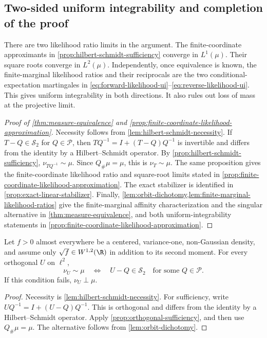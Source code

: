 \subsection{Two-sided uniform integrability and completion of the proof}
\label{sec:likelihood-convergence}

There are two likelihood ratio limits in the argument.
The finite-coordinate approximants in \cref{prop:hilbert-schmidt-sufficiency} converge in
\(L^1(\mu)\).
Their square roots converge in \(L^2(\mu)\).
Independently, once equivalence is known, the finite-marginal likelihood ratios and
their reciprocals are the two conditional-expectation martingales in
\eqref{eq:forward-likelihood-ui}--\eqref{eq:reverse-likelihood-ui}.
This gives uniform integrability in both directions.
It also rules out loss of mass at the projective limit.

\begin{proof}[Proof of \cref{thm:measure-equivalence} and \cref{prop:finite-coordinate-likelihood-approximation}]
Necessity follows from \cref{lem:hilbert-schmidt-necessity}.  If
$T-Q\in\mathcal S_2$ for $Q\in\mathcal P$, then
$TQ^{-1}=I+(T-Q)Q^{-1}$ is invertible and differs from the identity
by a Hilbert--Schmidt operator.  By \cref{prop:hilbert-schmidt-sufficiency},
$\nu_{TQ^{-1}}\sim\mu$.  Since $Q_\#\mu=\mu$, this is
$\nu_T\sim\mu$.  The same proposition gives the finite-coordinate
likelihood ratio and square-root limits stated in
\cref{prop:finite-coordinate-likelihood-approximation}.
The exact stabilizer is identified in \cref{prop:exact-linear-stabilizer}.
Finally, \cref{lem:orbit-dichotomy,lem:finite-marginal-likelihood-ratios}
give the finite-marginal affinity characterization and the singular
alternative in \cref{thm:measure-equivalence}, and both
uniform-integrability statements in
\cref{prop:finite-coordinate-likelihood-approximation}.
\end{proof}
\begin{theorem}
\label{thm:orthogonal-equivalence}
Let $f>0$ almost everywhere be a centered, variance-one, non-Gaussian
density, and assume only $\sqrt f\in W^{1,2}(\R)$ in addition
to its second moment.  For every orthogonal $U$ on $\ell^2$,
\[
 \nu_U\sim\mu
 \quad\Longleftrightarrow\quad
 U-Q\in\mathcal S_2
 \quad\text{for some }Q\in\mathcal P.
\]
If this condition fails, $\nu_U\perp\mu$.
\end{theorem}
\begin{proof}
Necessity is \cref{lem:hilbert-schmidt-necessity}.  For sufficiency, write
$UQ^{-1}=I+(U-Q)Q^{-1}$.  This is orthogonal and differs from the
identity by a Hilbert--Schmidt operator.  Apply
\cref{prop:orthogonal-sufficiency}, and then use
$Q_\#\mu=\mu$.  The alternative follows from
\cref{lem:orbit-dichotomy}.
\end{proof}

